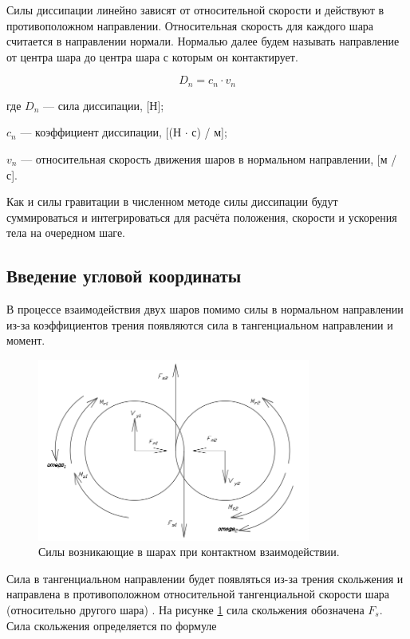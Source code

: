 \documentclass[a4paper]{article}
\begin{document}
Силы диссипации линейно зависят от относительной скорости и действуют в противоположном направлении.
Относительная скорость для каждого шара считается в направлении нормали.
Нормалью  далее будем называть направление от центра шара до центра шара с которым он контактирует.

\begin{equation}
\label{dempf_force}
D_n = c_n \cdot v_n
\end{equation}

где $D_n$ --- сила диссипации, [Н];

$c_n$ --- коэффициент диссипации, [(Н $\cdot$ с) / м];

$v_n$ --- относительная скорость движения шаров в нормальном направлении, [м / с].

Как и силы гравитации в численном методе силы диссипации будут суммироваться и интегрироваться для расчёта положения, скорости и ускорения тела на очередном шаге.




\subsection{Введение угловой координаты}
\label{angular_subsection}

В процессе взаимодействия двух шаров помимо силы в нормальном направлении из-за коэффициентов трения появляются сила в тангенциальном направлении и момент.

\begin{figure}[h!]
	\centering
	\label{pic:sily}
	\includegraphics[width=0.8\textwidth]{sily}
	\caption{Силы возникающие в шарах при контактном взаимодействии.}
\end{figure} 

Сила в тангенциальном направлении будет появляться из-за трения скольжения и направлена в противоположном относительной тангенциальной скорости шара (относительно другого шара) \cite{friction_calibration}. На рисунке \ref{pic:sily} сила скольжения обозначена $F_s$. Сила скольжения определяется по формуле
\end{document}
